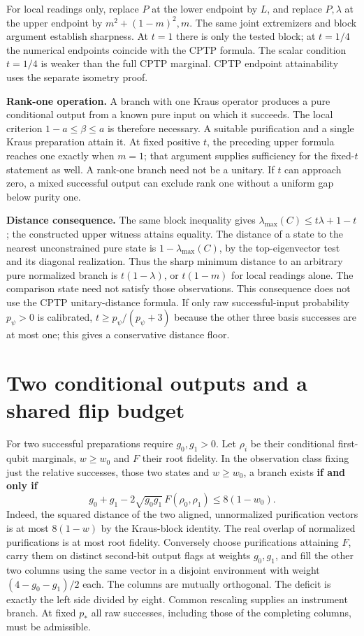 \documentclass[
  10pt,
  a4paper,
]{article}
\begin{document}
For local readings only, replace \(P\) at the lower endpoint by \(L\), and replace \(P,\lambda\) at the upper endpoint by \(m^2+(1-m)^2,m\). The same joint extremizers and block argument establish sharpness. At \(t=1\) there is only the tested block; at \(t=1/4\) the numerical endpoints coincide with the CPTP formula. The scalar condition \(t=1/4\) is weaker than the full CPTP marginal. CPTP endpoint attainability uses the separate isometry proof.

\textbf{Rank-one operation.} A branch with one Kraus operator produces a pure conditional output from a known pure input on which it succeeds. The local criterion \(1-a\le\beta\le a\) is therefore necessary. A suitable purification and a single Kraus preparation attain it. At fixed positive \(t\), the preceding upper formula reaches one exactly when \(m=1\); that argument supplies sufficiency for the fixed-\(t\) statement as well. A rank-one branch need not be a unitary. If \(t\) can approach zero, a mixed successful output can exclude rank one without a uniform gap below purity one.

\textbf{Distance consequence.} The same block inequality gives \(\lambda_{\max}(C)\le t\lambda+1-t\); the constructed upper witness attains equality. The distance of a state to the nearest unconstrained pure state is \(1-\lambda_{\max}(C)\), by the top-eigenvector test and its diagonal realization. Thus the sharp minimum distance to an arbitrary pure normalized branch is \(t(1-\lambda)\), or \(t(1-m)\) for local readings alone. The comparison state need not satisfy those observations. This consequence does not use the CPTP unitary-distance formula. If only raw successful-input probability \(p_\psi>0\) is calibrated, \(t\ge p_\psi/(p_\psi+3)\) because the other three basis successes are at most one; this gives a conservative distance floor.

\newpage

\section{Two conditional outputs and a shared flip budget}\label{two-conditional-outputs-and-a-shared-flip-budget}

For two successful preparations require \(g_0,g_1>0\). Let \(\rho_i\) be their conditional first-qubit marginals, \(w\ge w_0\) and \(F\) their root fidelity. In the observation class fixing just the relative successes, those two states and \(w\ge w_0\), a branch exists \textbf{if and only if} \[
 g_0+g_1-2\sqrt{g_0g_1}\,F(\rho_0,\rho_1)\le8(1-w_0).
\] Indeed, the squared distance of the two aligned, unnormalized purification vectors is at most \(8(1-w)\) by the Kraus-block identity. The real overlap of normalized purifications is at most root fidelity. Conversely choose purifications attaining \(F\), carry them on distinct second-bit output flags at weights \(g_0,g_1\), and fill the other two columns using the same vector in a disjoint environment with weight \((4-g_0-g_1)/2\) each. The columns are mutually orthogonal. The deficit is exactly the left side divided by eight. Common rescaling supplies an instrument branch. At fixed \(p_*\) all raw successes, including those of the completing columns, must be admissible.
\end{document}
